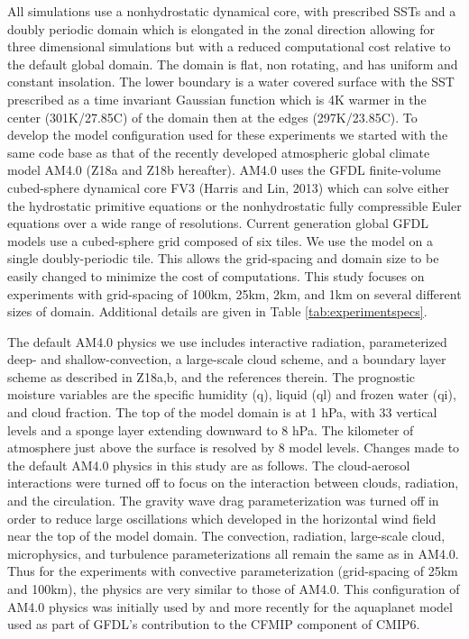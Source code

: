 \documentclass[draft]{agujournal2019}
\begin{document}
All simulations use a nonhydrostatic dynamical core, with prescribed SSTs and a doubly periodic domain which is elongated in the zonal 
direction allowing for three dimensional simulations but with a reduced computational cost relative to the default global domain.  
The domain is flat, non rotating, and has uniform and constant insolation.
The lower boundary is a water covered surface with the SST prescribed as a time invariant Gaussian function 
which is 4K warmer in the center (301K/27.85C) of the domain then 
at the edges (297K/23.85C).  
To develop the model configuration used for these experiments we started with the same code base as that of the 
recently developed atmospheric global climate model AM4.0 \cite{Zhao_etal18a, Zhao_etal18b} (Z18a and Z18b hereafter).
AM4.0 uses the GFDL finite-volume cubed-sphere dynamical core FV3 (Harris and Lin, 2013) 
which can solve either the hydrostatic primitive equations or the nonhydrostatic fully compressible Euler equations
over a wide range of resolutions.   
Current generation global GFDL models use a cubed-sphere grid composed of six tiles.  We use the model on a single doubly-periodic
tile.  This allows the grid-spacing and domain size to be easily changed to minimize the cost of computations.
This study focuses on experiments with grid-spacing of 100km, 25km, 2km, and 1km on several different
sizes of domain.  Additional details are given in Table \ref{tab:experimentspecs}.  

The default AM4.0 physics we use includes interactive radiation, parameterized deep- and shallow-convection, 
a large-scale cloud scheme, and a boundary layer 
scheme as described in Z18a,b, and the references therein.  The prognostic moisture variables are the specific 
humidity (q), liquid (ql) and frozen water (qi), and cloud fraction.  The top of the model domain is at 1 hPa, with 33 vertical 
levels and a sponge layer extending downward to 8 hPa.  The kilometer of atmosphere just above the surface is resolved by 
8 model levels.  Changes made to the default AM4.0 physics in this study are as follows.  The cloud-aerosol 
interactions were turned off to focus on the interaction between clouds, radiation, and the circulation.  The gravity wave drag 
parameterization was turned off 
in order to reduce large oscillations which developed in the horizontal wind field near the top of the model domain.  
The convection, radiation, large-scale cloud, microphysics, and turbulence parameterizations all remain the same 
as in AM4.0.   Thus for the experiments with convective parameterization (grid-spacing of 25km and 100km), the 
physics are very similar to those of AM4.0.  
This configuration of AM4.0 physics was initially used by  and more recently for the aquaplanet model
used as part of GFDL's contribution to the CFMIP component of CMIP6.  
\end{document}
